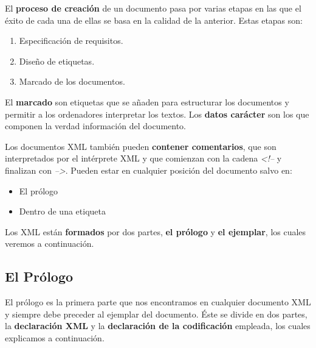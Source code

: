 El \textbf{proceso de creación} de un documento pasa por varias etapas en las que el éxito de cada una de ellas se basa en la calidad de la anterior. Estas etapas son:

\begin{enumerate}
    \item Especificación de requisitos.
    \item Diseño de etiquetas.
    \item Marcado de los documentos.
\end{enumerate}

El \textbf{marcado} son etiquetas que se añaden para estructurar los documentos y permitir a los ordenadores interpretar los textos. Los \textbf{datos carácter} son los que componen la verdad información del documento.

Los documentos XML también pueden \textbf{contener comentarios}, que son interpretados por el intérprete XML y que comienzan con la cadena \textit{<!--} y finalizan con \textit{-->}. Pueden estar en cualquier posición del documento salvo en:

\begin{itemize}
    \item El prólogo
    \item Dentro de una etiqueta
\end{itemize}

Los XML están \textbf{formados} por dos partes, \textbf{el prólogo} y \textbf{el ejemplar}, los cuales veremos a continuación.

\subsection{El Prólogo}
El prólogo es la primera parte que nos encontramos en cualquier documento XML y siempre debe preceder al ejemplar del documento. Éste se divide en dos partes, la \textbf{declaración XML} y la \textbf{declaración de la codificación} empleada, los cuales explicamos a continuación.

